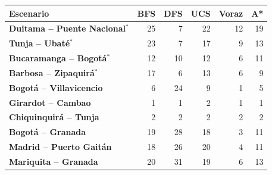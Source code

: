 \renewcommand{\arraystretch}{1.2}
\begin{tabular}{|l|r|r|r|r|r|}
\hline
\rowcolor{gray!20} \textbf{Escenario} & \textbf{BFS} & \textbf{DFS} & \textbf{UCS} & \textbf{Voraz} & \textbf{A*} \\
\hline
\textbf{Duitama -- Puente Nacional$^{*}$} & 25 & 7 & 22 & 12 & 19 \\
\hline
\textbf{Tunja -- Ubaté$^{*}$} & 23 & 7 & 17 & 9 & 13 \\
\hline
\textbf{Bucaramanga -- Bogotá$^{*}$} & 12 & 10 & 12 & 6 & 11 \\
\hline
\textbf{Barbosa -- Zipaquirá$^{*}$} & 17 & 6 & 13 & 6 & 9 \\
\hline
\textbf{Bogotá -- Villavicencio} & 6 & 24 & 9 & 1 & 5 \\
\hline
\textbf{Girardot -- Cambao} & 1 & 1 & 2 & 1 & 1 \\
\hline
\textbf{Chiquinquirá -- Tunja} & 2 & 2 & 2 & 2 & 2 \\
\hline
\textbf{Bogotá -- Granada} & 19 & 28 & 18 & 3 & 11 \\
\hline
\textbf{Madrid -- Puerto Gaitán} & 18 & 26 & 20 & 4 & 11 \\
\hline
\textbf{Mariquita -- Granada} & 20 & 31 & 19 & 6 & 13 \\
\hline
\end{tabular}
